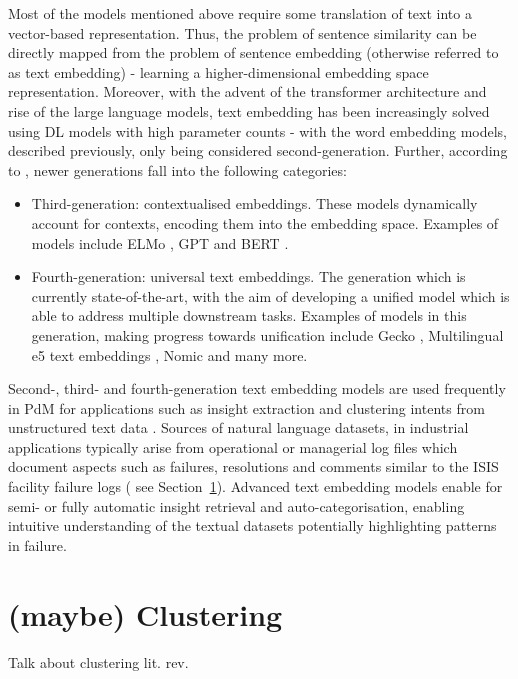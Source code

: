 \documentclass[10pt,oneside]{report}
\begin{document}
Most of the models mentioned above require some translation of text into a vector-based representation. Thus, the problem of sentence similarity can be directly mapped from the problem of sentence embedding (otherwise referred to as text embedding) - learning a higher-dimensional embedding space representation. Moreover, with the advent of the transformer architecture \cite{vaswani2017attention} and rise of the large language models, text embedding has been increasingly solved using DL models with high parameter counts \cite{cao2024recent} - with the word embedding models, described previously, only being considered second-generation. Further, according to \cite{cao2024recent}, newer generations fall into the following categories:
\begin{itemize}
    \item Third-generation: contextualised embeddings. These models dynamically account for contexts, encoding them into the embedding space. Examples of models include ELMo \cite{sarzynska2021detecting}, GPT \cite{radford2018improving} and BERT \cite{devlin2019bert}. 
    \item Fourth-generation: universal text embeddings. The generation which is currently state-of-the-art, with the aim of developing a unified model which is able to address multiple downstream tasks. Examples of models in this generation, making progress towards unification include Gecko \cite{lee2024gecko}, Multilingual e5 text embeddings \cite{wang2024multilingual}, Nomic \cite{nussbaum2024nomic} and many more. 
\end{itemize}

Second-, third- and fourth-generation text embedding models are used frequently in PdM for applications such as insight extraction \cite{abijith2023large,usuga2022using} and clustering intents from unstructured text data \cite{nota2022text}. Sources of natural language datasets, in industrial applications typically arise from operational or managerial log files which document aspects such as failures, resolutions and comments similar to the ISIS facility failure logs (\cite{todo} see Section~\ref{}). Advanced text embedding models enable for semi- or fully automatic insight retrieval and auto-categorisation, enabling intuitive understanding of the textual datasets potentially highlighting patterns in failure.


\section{(maybe) Clustering}
Talk about clustering lit. rev.
\end{document}
